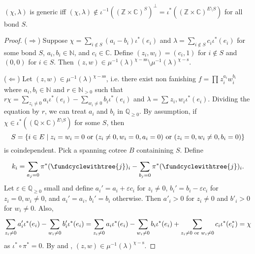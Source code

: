 \documentclass[b5paper]{article}
\newcommand{\del}{\setminus}
\newcommand{\sstab}{\mathrm{ss}}
\newcommand{\stab}{\mathrm{s}}
\begin{document}
\begin{proposition}[pps:]{}
  $(\chi,\lambda)$ is generic iff $(\chi,\lambda)\notin \iota^{-1}((\mathbb{Z}\times \mathbb{C})^S)^\perp=\iota^*((\mathbb{Z}\times \mathbb{C})^{E\del S})$ for all bond $S$.
  \begin{proof}
    ($\Rightarrow $) Suppose $\chi=\sum_{i\notin S}^{}(a_i-b_i)\iota^*(e_i)$ and $\lambda=\sum_{i\notin S}c_i\iota^*(e_i)$ for some bond $S$, $a_i,b_i\in \mathbb{N}$, and $c_i\in \mathbb{C}$. Define $(z_i,w_i)=(c_i,1)$ for $i\notin S$ and $(0,0)$ for $i\in S$. Then $(z,w)\in \mu^{-1}(\lambda)^{\chi-\sstab}\del\mu^{-1}(\lambda)^{\chi-\stab}$.

    ($\Leftarrow $) Let $(z,w)\in \mu^{-1}(\lambda)^{\chi-\sstab}$, i.e. there exist non fanishing $f=\prod_{}^{}z_i^{a_i}w_i^{b_i}$ where $a_i,b_i\in \mathbb{N}$ and $r\in \mathbb{N}_{>0}$ such that $r\chi=\sum_{z_i\neq 0}^{}a_i\iota^*(e_i)-\sum_{w_i\neq 0}^{}b_i\iota^*(e_i)$ and $\lambda=\sum_{}^{}z_i,w_i\iota^*(e_i)$. Dividing the equation by $r$, we can treat $a_i$ and $b_i$ in $\mathbb{Q}_{\geq 0}$.
    By assumption, if $\chi\in \iota^*((\mathbb{Q}\times \mathbb{C})^{E\del S})$ for some $S$, then 
    \[
      S=\left\{i\in E\mid z_i=w_i=0\textnormal{ or }(z_i\neq 0,w_i=0,a_i=0)\textnormal{ or }(z_i=0,w_i\neq 0,b_i=0)\right\}
    \]
    is coindependent.
    Pick a spanning cotree $B$ containining $S$.
    Define 
    \[
        k_i=\sum_{a_j=0}^{}\pi^*(\fundcyclewithtree{j})_i-\sum_{b_j=0}^{}\pi^*(\fundcyclewithtree{j})_i.
    \]
    Let $\varepsilon\in \mathbb{Q}_{\geq 0}$ small and define $a_i'=a_i+\varepsilon c_i$ for $z_i\neq 0$, $b_i'=b_i-\varepsilon c_i$ for $z_i=0,w_i\neq 0$, and $a_i'=a_i$, $b_i'=b_i$ otherwise.
    Then $a'_i>0$ for $z_i\neq 0$ and $b'_i>0$ for $w_i\neq 0$. Also, 
    \[
        \sum_{z_i\neq 0}^{}a_i'\iota^*(e_i)-\sum_{w_i\neq 0}^{}b_i'\iota^*(e_i)=\sum_{z_i\neq 0}^{}a_i\iota^*(e_i)-\sum_{w_i\neq 0}^{}b_i\iota^*(e_i) + \sum_{z_i\neq 0\textnormal{ or }w_i\neq 0}^{}c_i\iota^*(e_i^*)=\chi
    \]
    as $\iota^*\circ \pi^*=0$. By  and , $(z,w)\in \mu^{-1}(\lambda)^{\chi-\stab}$.
  \end{proof}
\end{proposition}
\end{document}
